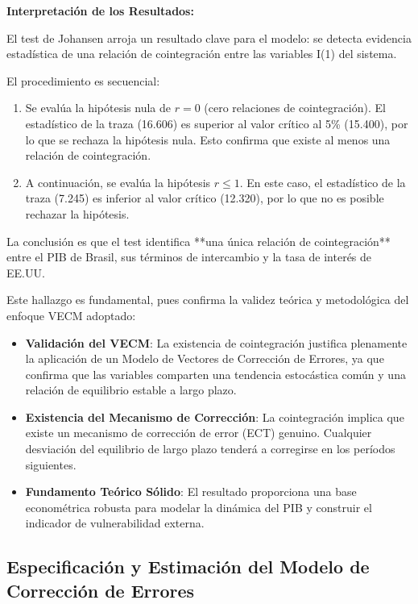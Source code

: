 \documentclass[3p,11pt]{elsarticle}
\begin{document}
\textbf{Interpretación de los Resultados:}

El test de Johansen arroja un resultado clave para el modelo: se detecta evidencia estadística de una relación de cointegración entre las variables I(1) del sistema.

El procedimiento es secuencial:
\begin{enumerate}
    \item Se evalúa la hipótesis nula de $r=0$ (cero relaciones de cointegración). El estadístico de la traza (16.606) es superior al valor crítico al 5\% (15.400), por lo que se rechaza la hipótesis nula. Esto confirma que existe al menos una relación de cointegración.
    \item A continuación, se evalúa la hipótesis $r \leq 1$. En este caso, el estadístico de la traza (7.245) es inferior al valor crítico (12.320), por lo que no es posible rechazar la hipótesis.
\end{enumerate}

La conclusión es que el test identifica **una única relación de cointegración** entre el PIB de Brasil, sus términos de intercambio y la tasa de interés de EE.UU.

Este hallazgo es fundamental, pues confirma la validez teórica y metodológica del enfoque VECM adoptado:
\begin{itemize}
    \item \textbf{Validación del VECM}: La existencia de cointegración justifica plenamente la aplicación de un Modelo de Vectores de Corrección de Errores, ya que confirma que las variables comparten una tendencia estocástica común y una relación de equilibrio estable a largo plazo.
    \item \textbf{Existencia del Mecanismo de Corrección}: La cointegración implica que existe un mecanismo de corrección de error (ECT) genuino. Cualquier desviación del equilibrio de largo plazo tenderá a corregirse en los períodos siguientes.
    \item \textbf{Fundamento Teórico Sólido}: El resultado proporciona una base econométrica robusta para modelar la dinámica del PIB y construir el indicador de vulnerabilidad externa.
\end{itemize}

\subsection{Especificación y Estimación del Modelo de Corrección de Errores}
\end{document}
